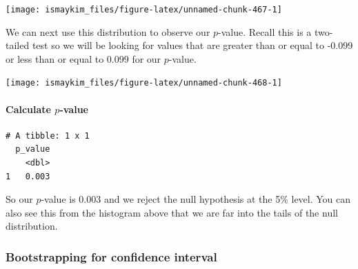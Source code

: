 \documentclass[12pt, krantz2,]{krantz}
\makeatletter
\newenvironment{Shaded}{\begin{snugshade}}{\end{snugshade}}
\newcommand{\DataTypeTok}[1]{\textcolor[rgb]{0.27,0.27,0.27}{#1}}
\newcommand{\KeywordTok}[1]{\textcolor[rgb]{0.27,0.27,0.27}{\textbf{#1}}}
\newcommand{\NormalTok}[1]{#1}
\newcommand{\OperatorTok}[1]{\textcolor[rgb]{0.43,0.43,0.43}{\textbf{#1}}}
\newcommand{\StringTok}[1]{\textcolor[rgb]{0.5,0.5,0.5}{#1}}
\let\oldparagraph\paragraph
\renewcommand{\paragraph}[1]{\oldparagraph{#1}\mbox{}}
\newenvironment{kframe}{%
\medskip{}
\setlength{\fboxsep}{.8em}
 \def\at@end@of@kframe{}%
 \ifinner\ifhmode%
  \def\at@end@of@kframe{\end{minipage}}%
  \begin{minipage}{\columnwidth}%
 \fi\fi%
 \def\FrameCommand##1{\hskip\@totalleftmargin \hskip-\fboxsep
 \colorbox{shadecolor}{##1}\hskip-\fboxsep
     \hskip-\linewidth \hskip-\@totalleftmargin \hskip\columnwidth}%
 \MakeFramed {\advance\hsize-\width
   \@totalleftmargin\z@ \linewidth\hsize
   \@setminipage}}%
 {\par\unskip\endMakeFramed%
 \at@end@of@kframe}
\renewenvironment{Shaded}{\begin{kframe}}{\end{kframe}}
\makeatother
\begin{document}
\begin{center}\texttt{[image: ismaykim\_files/figure-latex/unnamed-chunk-467-1]} \end{center}

We can next use this distribution to observe our \(p\)-value. Recall this is a two-tailed test so we will be looking for values that are greater than or equal to -0.099 or less than or equal to 0.099 for our \(p\)-value.

\begin{Shaded}
\end{Shaded}

\begin{center}\texttt{[image: ismaykim\_files/figure-latex/unnamed-chunk-468-1]} \end{center}

\hypertarget{calculate-p-value-2}{%
\paragraph{\texorpdfstring{Calculate \(p\)-value}{Calculate p-value}}\label{calculate-p-value-2}}

\begin{Shaded}
\end{Shaded}

\begin{verbatim}
# A tibble: 1 x 1
  p_value
    <dbl>
1   0.003
\end{verbatim}

So our \(p\)-value is 0.003 and we reject the null hypothesis at the 5\% level. You can also see this from the histogram above that we are far into the tails of the null distribution.

\hypertarget{bootstrapping-for-confidence-interval-2}{%
\subsubsection*{Bootstrapping for confidence interval}\label{bootstrapping-for-confidence-interval-2}}
\end{document}
